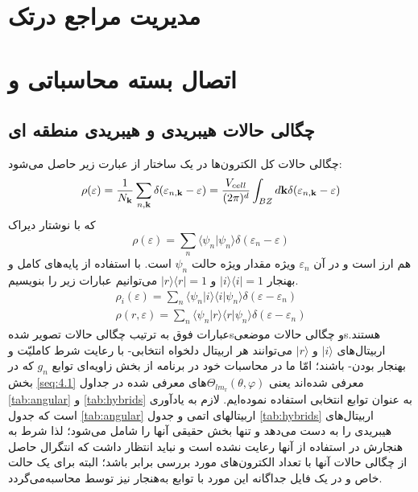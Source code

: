 \chapter{مدیریت مراجع درتک}\label{App:Refan}
\thispagestyle{empty}
\chapter{اتصال بسته محاسباتی  و}\label{chp:chap4}
\thispagestyle{empty}
\rhead{\leftmark}

\section{چگالی‌ حالات هیبریدی و هیبریدی منطقه ای }\label{seq:4.2}
چگالی حالات کل الکترون‌ها در یک ساختار از عبارت زیر حاصل می‌شود:\cite{Martin2004}
\begin{equation}
 \rho(\varepsilon)=\frac{1}{N_{{\bf k}}}\sum_{n,{\bf k}}\delta(\varepsilon_{n,{\bf k}}-\varepsilon)=\frac{V_{cell}}{(2\pi)^d} \int_{BZ} d{\bf k}\delta(\varepsilon_{n,{\bf k}}-\varepsilon)
\end{equation}
که با نوشتار دیراک 
\begin{equation}
 \rho(\varepsilon)=\sum_{n}\langle\psi_n|\psi_n\rangle\delta(\varepsilon_{n}-\varepsilon)
\end{equation}
هم ارز است  و در آن $\varepsilon_n$ ویژه مقدار ویژه حالت $\psi_n$ است. با استفاده از پایه‌های کامل و بهنجار $|i\rangle\langle i|=1$ و $|r\rangle\langle r|=1$ می‌توانیم عبارات زیر را بنویسیم.
\begin{align}
\rho_{i}(\varepsilon)=\sum_n\langle\psi_n|i\rangle\langle i|\psi_n\rangle\delta(\varepsilon-\varepsilon_n)\label{eq:4.2.3}\\
\rho(r,\varepsilon)=\sum_n\langle\psi_n|r\rangle\langle r|\psi_n\rangle\delta(\varepsilon-\varepsilon_n)\label{eq:4.2.4}
\end{align}
عبارات فوق به ترتیب \glspl{چگالی حالات تصویر شده}و \glspl{چگالی حالات موضعی}هستند.\cite{gpaw} 
اربیتال‌های $|i\rangle$ و $|r\rangle$ می‌توانند هر اربیتال دلخواه انتخابی- با رعایت شرط کاملیّت و بهنجار 
بودن- باشند؛ امّا ما در محاسبات خود در برنامه  از بخش زاویه‌ای توابع $g_n$ که در 
بخش \ref{seq:4.1} معرفی شده‌اند یعنی $\Theta_{lm_{\mathrm{r}}}(\theta,\varphi)$های معرفی شده در جداول 
\ref{tab:angular} و \ref{tab:hybrids} به عنوان توابع انتخابی استفاده نموده‌ایم. لازم به یادآوری است که 
جدول \ref{tab:angular} اربیتالهای اتمی و جدول  \ref{tab:hybrids} اربیتال‌های هیبریدی را به دست می‌دهد و 
تنها بخش حقیقی آنها را شامل می‌شود؛\cite{Rehfeld1978,Weissteina} لذا شرط به هنجارش در استفاده از آنها 
رعایت نشده است و نباید انتظار داشت که انتگرال حاصل از چگالی حالات آنها با تعداد الکترون‌های مورد بررسی 
برابر باشد؛ البته برای یک حالت خاص و در یک فایل جداگانه این مورد با توابع به‌هنجار نیز توسط 
 محاسبه‌می‌گردد.

